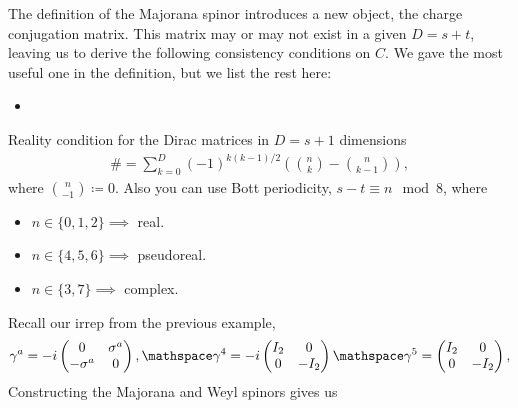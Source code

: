 \documentclass[11pt]{article}
\begin{document}
The definition of the Majorana spinor introduces a new object,
the charge conjugation matrix. This matrix may or may not exist
in a given $D = s + t$, leaving us to derive the following consistency
conditions on $C$. We gave the most useful one in the definition,
but we list the rest here:
\begin{itemize}
    \item {}
\end{itemize}


Reality condition for the Dirac matrices in $D = s + 1$
dimensions
\begin{align*}
    \# = \sum_{k = 0}^D (-1)^{k(k - 1)/2} \left( {n \choose k} - {n \choose k - 1} \right),
\end{align*}
where ${n \choose - 1} \coloneqq 0$. Also you can use
Bott periodicity, $s - t \equiv n \mod 8$, where
\begin{itemize}
    \item $n \in \{ 0, 1, 2 \} \implies $ real.
    \item $n \in \{ 4, 5, 6 \} \implies $ pseudoreal.
    \item $n \in \{ 3, 7 \} \implies $ complex.
\end{itemize}

\begin{eexample}
    [Majorana and Weyl spinors in $D = 3 + 1$]
    Recall our irrep from the previous example,
    \begin{align*}
        \gamma^a = - i \begin{pmatrix}
            0 & \sigma^a\\
            - \sigma^a & 0
        \end{pmatrix},
        \mathspace
        \gamma^4 = -i \begin{pmatrix}
            I_2 & 0\\
            0 & -I_2
        \end{pmatrix}
        \mathspace
        \gamma^5 = \begin{pmatrix}
            I_2 & 0\\
            0 & -I_2
        \end{pmatrix},
    \end{align*}
    Constructing the Majorana and Weyl spinors gives us 
\end{eexample}
\end{document}
